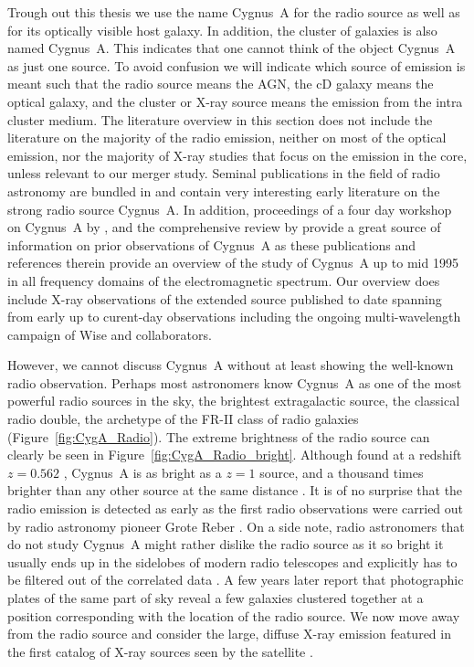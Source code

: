 \documentclass[MScProj_TLRH_ClusterEnergy.tex]{subfiles}
\begin{document}
Trough out this thesis we use the name Cygnus~A for the radio source as well as 
for its optically visible host galaxy. In addition, the cluster of galaxies is 
also named Cygnus~A. This indicates that one cannot think of the object Cygnus~A 
as just one source. To avoid confusion we will indicate which source of emission
is meant such that the radio source means the AGN, the cD galaxy means the optical
galaxy, and the cluster or X-ray source means the emission from the intra cluster 
medium. The literature overview in this section does not include the literature 
on the majority of the radio emission, neither on most of the optical emission, 
nor the majority of X-ray studies that focus on the emission in the core, unless 
relevant to our merger study. Seminal publications in the field of radio astronomy
are bundled in \citet{1982cra..book.....S} and contain very interesting early 
literature on the strong radio source Cygnus~A. In addition, proceedings of a 
four day workshop on Cygnus~A by \citet{1996cyga.book.....C}, and the 
comprehensive review by \citet{1996A&ARv...7....1C} provide a great source of 
information on prior observations of Cygnus~A as these publications and 
references therein provide an overview of the study of Cygnus~A up to mid 1995 
in all frequency domains of the electromagnetic spectrum. Our overview does 
include X-ray observations of the extended source published to date spanning from
early  up to curent-day  observations 
including the ongoing multi-wavelength campaign of Wise and collaborators. 

However, we cannot discuss Cygnus~A without at least showing the well-known 
radio observation. Perhaps most astronomers know Cygnus~A as one of the most 
powerful radio sources in the sky, the brightest extragalactic source, the 
classical radio double, the archetype of the FR-II class \citep{1974MNRAS.167P..31F}
of radio galaxies (Figure~\ref{fig:CygA_Radio}). The extreme brightness of the 
radio source can clearly be seen in Figure~\ref{fig:CygA_Radio_bright}. Although 
found at a redshift $z=0.562$ \citep{1997ApJ...488L..15O},
Cygnus~A is as bright as a $z=1$ source, and a thousand times brighter than any
other source at the same distance \citep{1996cyga.book....1S, 1996A&ARv...7....1C}.
It is of no surprise that the radio emission is detected as early as the first radio
observations were carried out by radio astronomy pioneer Grote Reber
\citet{1944ApJ...100..279R, reber1948cosmic}. On a side note, radio astronomers 
that do not study Cygnus~A might rather dislike the radio source as it so bright
it usually ends up in the sidelobes of modern radio telescopes and explicitly has
to be filtered out of the correlated data \citep[e.g.][]{2012MNRAS.422..563O}. A
few years later \citet{1954ApJ...119..206B} report that photographic plates of the
same part of sky reveal a few galaxies clustered together at a position corresponding
with the location of the radio source. We now move away from the radio source
and consider the large, diffuse X-ray emission featured in the first catalog 
of X-ray sources seen by the  satellite \citep{1972ApJ...178..281G}. 
\end{document}
